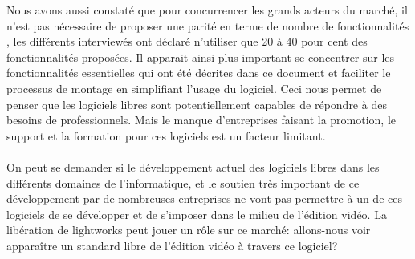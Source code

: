 Nous avons aussi constaté que pour concurrencer les grands acteurs du
marché, il n'est pas nécessaire de proposer une parité en terme de
nombre de fonctionnalités , les différents interviewés ont déclaré
n'utiliser que 20 à 40 pour cent des fonctionnalités proposées. Il
apparait ainsi plus important se concentrer sur les fonctionnalités
essentielles qui ont été décrites dans ce document et
faciliter le processus de montage en simplifiant l'usage du logiciel. Ceci
nous permet de penser que les logiciels libres sont potentiellement
capables de répondre à des besoins de professionnels.  Mais le manque
d'entreprises faisant la promotion, le support et la formation pour ces
logiciels est un facteur limitant.

\paragraph{}

On peut se demander si le développement actuel des logiciels libres
dans les différents domaines de l'informatique, et le soutien très
important de ce développement par de nombreuses entreprises ne vont pas
permettre à un de ces logiciels de se développer et de s'imposer dans
le milieu de l'édition vidéo.  La libération de lightworks peut jouer
un rôle sur ce marché: allons-nous voir apparaître un standard libre
de l'édition vidéo à travers ce logiciel?
